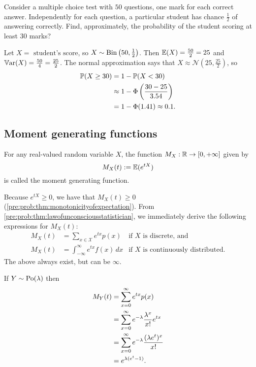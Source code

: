 \documentclass[10pt, a4paper]{article}
\begin{document}
\begin{example}
    Consider a multiple choice test with $50$ questions,
    one mark for each correct answer.
    Independently for each question,
    a particular student has chance $\frac{1}{2}$ of answering correctly.
    Find,
    approximately,
    the probability of the student scoring at least $30$ marks?

    Let $X = \text{ student's score}$,
    so $X \sim \Bin\left(50, \frac{1}{2}\right)$.
    Then $\E(X) = \frac{50}{2} = 25$ and $\Var(X) = \frac{50}{4} = \frac{25}{2}$.
    The normal approximation says that $X \approx \mathcal{N}\left(25, \frac{25}{2}\right)$,
    so
    \begin{align*}
        \P(X \geq 30) &= 1 - \P(X < 30) \\
        &\approx 1 - \Phi\left(\frac{30 - 25}{3.54}\right) \\
        &= 1 - \Phi(1.41) \approx 0.1.
    \end{align*}
\end{example}

\subsection{Moment generating functions}

\begin{definition}
    For any real-valued random variable $X$,
    the function $M_X : \R \rightarrow [0, +\infty]$ given by
    \[
    M_X(t) := \E(e ^ {tX})
    \]
    is called the moment generating function.
\end{definition}

Because $e ^ {tX} \geq 0$,
we have that $M_X(t) \geq 0$
(\autoref{pre:prob:thm:monotonicityofexpectation}).
From \autoref{pre:prob:thm:lawofunconsciousstatistician},
we immediately derive the following expressions for $M_X(t)$:
\begin{align*}
    M_X(t) &= \sum_{x \in \mathcal{X}}e ^ {tx}p(x) &\text{if $X$ is discrete, and} \\
    M_X(t) &= \int_{-\infty}^{\infty}e ^ {tx}f(x)\,dx &\text{if $X$ is continuously distributed}.
\end{align*}
The above always exist,
but can be $\infty$.

\begin{example}
    If $Y \sim \Po(\lambda)$ then
    \begin{align*}
        M_Y(t) &= \infsum[x = 0]e ^ {tx}p(x) \\
        &= \infsum[x = 0]e ^ {-\lambda}\frac{\lambda ^ x}{x!}e ^ {tx} \\
        &= \infsum[x = 0]e ^ {-\lambda}\frac{(\lambda e ^ t) ^ x}{x!} \\
        &= e ^ {\lambda(e ^ t - 1)}.
    \end{align*}
\end{example}
\end{document}

